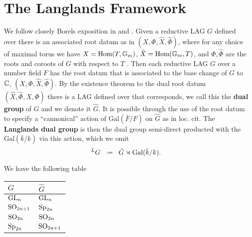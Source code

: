 \section{The Langlands Framework}
We follow closely Borels exposition in \cite[Part 2. III. 2. ]{borelAutomorphicFormsRepresentations1979} and \cite{shahidiEisensteinSeriesAutomorphic2010}.
Given a reductive LAG \(G\) defined over \C there is an associated root datum as in \((X, \Phi, \hat{X}, \hat{\Phi})\), where for any choice of maximal torus we have \(X = \operatorname{Hom}(T, \mathbb{G}_m)\), \(\hat{X} = \operatorname{Hom}(\mathbb{G}_m, T)\), and \(\Phi, \hat\Phi\) are the roots and coroots of \(G\) with respect to \(T\) \cite[7.4.3]{springerLinearAlgebraicGroups1998}.  Then each reductive LAG \(G\) over a number field \(F\) has the root datum that is associated to the base change of \(G\) to \(\C\), \((X, \Phi, \hat{X}, \hat{\Phi})\).
By the existence theorem \cite[10]{springerLinearAlgebraicGroups1998} to the dual root datum \(( \hat{X}, \hat{\Phi}, X, \Phi)\) there is a LAG defined over \C that corresponds, we call this the \textbf{dual group} of \(G\) and we denote it \(\hat{G}\). It is possible through the use of the root datum to specify a ``cannonical'' action of \(\mathrm{Gal}(\bar{F}/F)\) on \(\hat{G}\) as in loc. cit.
The \textbf{Langlands dual group} is then the dual group semi-direct producted with the \(\mathrm{Gal}(\bar{k}/k)\) via this action, which we omit
\[^L G \defeq \hat{G} \rtimes \mathrm{Gal}(\bar{k}/k).\]

\begin{example}
	We have the following table
	\begin{table}[h]
		\centering
		\begin{tabular}{ll}
			\(G\)         & \(\hat{G}\)   \\ \hline
			\(\operatorname{GL}_n\)     & \(\operatorname{GL}_n\)     \\
			\(\operatorname{SO}_{2n+1}\) & \(\operatorname{Sp}_{2n}\)  \\
			\(\operatorname{SO}_{2n}\)   & \(\operatorname{SO}_{2n}\)   \\
			\(\operatorname{Sp}_{2n}\)  & \(\operatorname{SO}_{2n+1}\)
		\end{tabular}
	\end{table}
\end{example}

